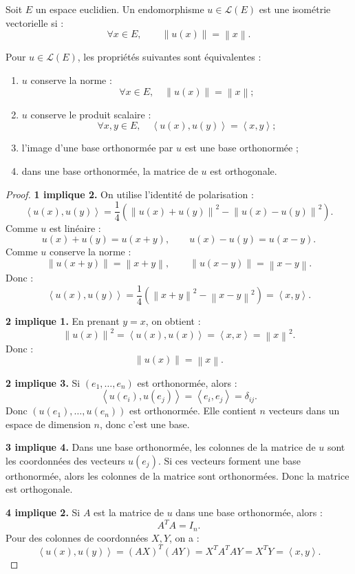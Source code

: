 \documentclass[11pt,a4paper]{article}
\newcommand{\Lcal}{\mathcal L}
\newcommand{\norme}[1]{\left\lVert #1\right\rVert}
\newcommand{\scal}[2]{\left\langle #1,#2\right\rangle}
\begin{document}
\begin{definitionbox}
Soit \(E\) un espace euclidien.  
Un endomorphisme \(u\in\Lcal(E)\) est une isométrie vectorielle si :
\[
\forall x\in E,\qquad \norme{u(x)}=\norme{x}.
\]
\end{definitionbox}

\begin{theorembox}
Pour \(u\in\Lcal(E)\), les propriétés suivantes sont équivalentes :
\begin{enumerate}
    \item \(u\) conserve la norme :
    \[
    \forall x\in E,\quad \norme{u(x)}=\norme{x};
    \]
    \item \(u\) conserve le produit scalaire :
    \[
    \forall x,y\in E,\quad \scal{u(x)}{u(y)}=\scal{x}{y};
    \]
    \item l'image d'une base orthonormée par \(u\) est une base orthonormée ;
    \item dans une base orthonormée, la matrice de \(u\) est orthogonale.
\end{enumerate}
\end{theorembox}

\begin{proof}
\textbf{1 implique 2.}  
On utilise l'identité de polarisation :
\[
\scal{u(x)}{u(y)}
=
\frac14\left(\norme{u(x)+u(y)}^2-\norme{u(x)-u(y)}^2\right).
\]
Comme \(u\) est linéaire :
\[
u(x)+u(y)=u(x+y),
\qquad
u(x)-u(y)=u(x-y).
\]
Comme \(u\) conserve la norme :
\[
\norme{u(x+y)}=\norme{x+y},
\qquad
\norme{u(x-y)}=\norme{x-y}.
\]
Donc :
\[
\scal{u(x)}{u(y)}
=
\frac14\left(\norme{x+y}^2-\norme{x-y}^2\right)
=
\scal{x}{y}.
\]

\textbf{2 implique 1.}  
En prenant \(y=x\), on obtient :
\[
\norme{u(x)}^2=\scal{u(x)}{u(x)}=\scal{x}{x}=\norme{x}^2.
\]
Donc :
\[
\norme{u(x)}=\norme{x}.
\]

\textbf{2 implique 3.}  
Si \((e_1,\dots,e_n)\) est orthonormée, alors :
\[
\scal{u(e_i)}{u(e_j)}=\scal{e_i}{e_j}=\delta_{ij}.
\]
Donc \((u(e_1),\dots,u(e_n))\) est orthonormée.  
Elle contient \(n\) vecteurs dans un espace de dimension \(n\), donc c'est une base.

\textbf{3 implique 4.}  
Dans une base orthonormée, les colonnes de la matrice de \(u\) sont les coordonnées des vecteurs \(u(e_j)\).  
Si ces vecteurs forment une base orthonormée, alors les colonnes de la matrice sont orthonormées.  
Donc la matrice est orthogonale.

\textbf{4 implique 2.}  
Si \(A\) est la matrice de \(u\) dans une base orthonormée, alors :
\[
A^TA=I_n.
\]
Pour des colonnes de coordonnées \(X,Y\), on a :
\[
\scal{u(x)}{u(y)}
=
(AX)^T(AY)
=
X^TA^TAY
=
X^TY
=
\scal{x}{y}.
\]
\end{proof}
\end{document}
